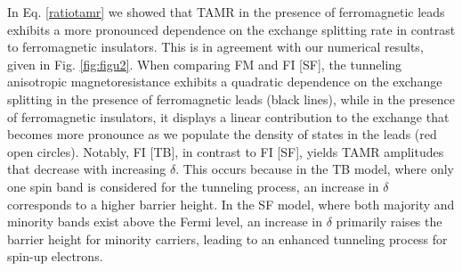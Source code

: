 \documentclass[10pt,pr,twocolumn,showpacs,amssymb,floatfix,superscriptaddress]{revtex4-1}
\begin{document}
In Eq. \eqref{ratiotamr} we showed that TAMR in the presence of ferromagnetic leads exhibits a more pronounced dependence on the exchange splitting rate in contrast to ferromagnetic insulators. This is in agreement with our numerical results, given in Fig. \ref{fig:figu2}. When comparing FM and FI [SF], the tunneling anisotropic magnetoresistance exhibits a quadratic dependence on the exchange splitting in the presence of ferromagnetic leads (black lines), while in the presence of ferromagnetic insulators, it displays a linear contribution to the exchange that becomes more pronounce as we populate the density of states in the leads (red open circles). Notably, FI [TB], in contrast to FI [SF], yields TAMR amplitudes that decrease with increasing $\delta$. This occurs because in the TB model, where only one spin band is considered for the tunneling process, an increase in $\delta$ corresponds to a higher barrier height. In the SF model, where both majority and minority bands exist above the Fermi level, an increase in $\delta$ primarily raises the barrier height for minority carriers, leading to an enhanced tunneling process for spin-up electrons.
\end{document}
